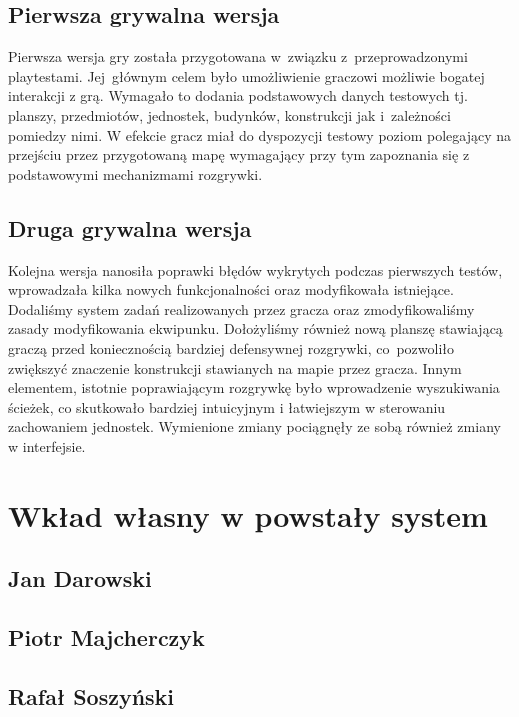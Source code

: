 \documentclass[licencjacka]{pracamgr}
\begin{document}
  \section{Pierwsza grywalna wersja}
  Pierwsza wersja gry została przygotowana w~związku z~przeprowadzonymi playtestami. Jej~głównym celem było
  umożliwienie graczowi możliwie bogatej interakcji z grą. Wymagało to dodania podstawowych
  danych testowych tj. planszy, przedmiotów, jednostek, budynków, konstrukcji jak i~zależności pomiedzy nimi.
  W efekcie gracz miał do dyspozycji testowy poziom polegający na przejściu przez przygotowaną mapę wymagający
  przy tym zapoznania się z podstawowymi mechanizmami rozgrywki.

  \section{Druga grywalna wersja}
  Kolejna wersja nanosiła poprawki błędów wykrytych podczas pierwszych testów, wprowadzała kilka nowych funkcjonalności
  oraz modyfikowała istniejące. Dodaliśmy system zadań realizowanych przez gracza oraz zmodyfikowaliśmy zasady modyfikowania
  ekwipunku. Dołożyliśmy również nową planszę stawiającą graczą przed koniecznością bardziej defensywnej rozgrywki,
  co~pozwoliło zwiększyć znaczenie konstrukcji stawianych na mapie przez gracza. Innym elementem, istotnie poprawiającym
  rozgrywkę było wprowadzenie wyszukiwania ścieżek, co skutkowało bardziej intuicyjnym i łatwiejszym w sterowaniu
  zachowaniem jednostek. Wymienione zmiany pociągnęły ze sobą również zmiany w interfejsie.

\chapter{Wkład własny w powstały system}

  \section{Jan Darowski}

  \section{Piotr Majcherczyk}

  \section{Rafał Soszyński}
\end{document}
